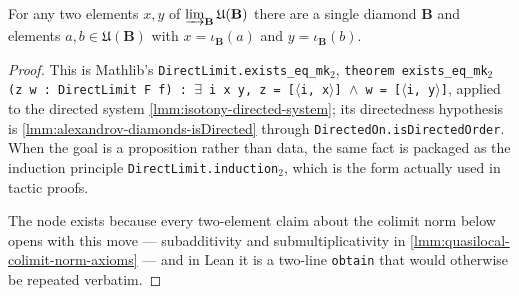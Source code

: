 \begin{lemma}
    \label{lmm:quasilocal-colimit-common-representatives}
    \leanok
    For any two elements $x, y$ of $\varinjlim_{\mathbf{B}} \mathfrak{U}(\mathbf{B})$ there are a single diamond $\mathbf{B}$ and elements $a, b \in \mathfrak{U}(\mathbf{B})$ with $x = \iota_{\mathbf{B}}(a)$ and $y = \iota_{\mathbf{B}}(b)$.
\end{lemma}
\begin{proof}
    \leanok
    This is Mathlib's \texttt{DirectLimit.exists\_eq\_mk\ensuremath{_2}}, \texttt{theorem exists\_eq\_mk\ensuremath{_2} (z w : DirectLimit F f) : \ensuremath{\exists} i x y, z = [\ensuremath{\langle}i, x\ensuremath{\rangle}] \ensuremath{\wedge} w = [\ensuremath{\langle}i, y\ensuremath{\rangle}]}, applied to the directed system \ref{lmm:isotony-directed-system}; its directedness hypothesis is \ref{lmm:alexandrov-diamonds-isDirected} through \texttt{DirectedOn.isDirectedOrder}. When the goal is a proposition rather than data, the same fact is packaged as the induction principle \texttt{DirectLimit.induction\ensuremath{_2}}, which is the form actually used in tactic proofs.

    The node exists because every two-element claim about the colimit norm below opens with this move --- subadditivity and submultiplicativity in \ref{lmm:quasilocal-colimit-norm-axioms} --- and in Lean it is a two-line \texttt{obtain} that would otherwise be repeated verbatim.
\end{proof}

